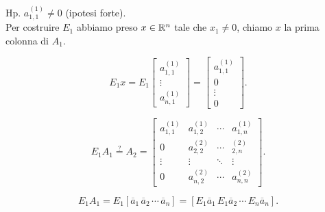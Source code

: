 Hp. $a_{1,1}^{(1)} \neq 0$ (ipotesi forte).\\
Per costruire $E_1$ abbiamo preso $x \in \mathbb{R}^n$ tale che $x_1 \neq 0$, chiamo
$x$ la prima colonna di $A_1$.

\[ E_1x =
E_1 \left[\begin{array}{c}a_{1,1}^{(1)}\\ \vdots \\ a_{n,1}^{(1)}\end{array}\right]
=
\left[\begin{array}{c}a_{1,1}^{(1)}\\ 0 \\ \vdots \\ 0\end{array}\right].
\]

\[
E_1A_1 \stackrel{?}{=}  A_2 = \left[
\begin{array}{cccc}
a_{1,1}^{(1)} & a_{1,2}^{(1)} & \cdots & a_{1,n}^{(1)} \\
0 & a_{2,2}^{(2)} & \cdots & _{2,n}^{(2)} \\
\vdots & \vdots & \ddots & \vdots \\
0 & a_{n,2}^{(2)} & \cdots & a_{n,n}^{(2)}
\end{array} \right].
\]

\[E_1A_1 = E_1[\overline{a}_1 \, \overline{a}_2 \, \cdots \, \overline{a}_n]
= [E_1\overline{a}_1 \, E_1\overline{a}_2 \, \cdots \, E_n\overline{a}_n].\]

